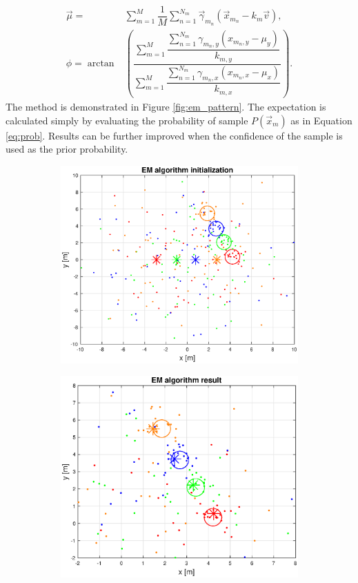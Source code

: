 \begin{align}
\vec{\mu} =& \sum_{m=1}^M \dfrac{1}{M}\sum_{n = 1}^{N_m}  \vec{\gamma}_{m_n} \left( \vec{x}_{m_n} - k_m \vec{v} \right) , \\
\phi = \arctan & \left( \dfrac{\sum_{m=1}^{M} \dfrac{\sum_{n = 1}^{N_m} \gamma_{m_n, y}(x_{m_n, y} - \mu_y)}{k_{m, y} } }{\sum_{m=1}^{M} \dfrac{\sum_{n = 1}^{N_m} \gamma_{m_n, x} (x_{m_n, x} - \mu_x) }{k_{m, x}} }\right).
\end{align}
The method is demonstrated in Figure \ref{fig:em_pattern}. The expectation is calculated simply by evaluating the probability of sample $P(\vec{x}_m)$ as in Equation \ref{eq:prob}. Results can be further improved when the confidence of the sample is used as the prior probability.

\begin{figure}[H]
	\centering
	\begin{subfigure}{0.49\textwidth}
		\centering
		\includegraphics[scale=0.43]{fig/em_init.eps}
	\end{subfigure}
	\begin{subfigure}{.49\textwidth}
		\centering
		\includegraphics[scale=0.43]{fig/em_result.eps}


\end{subfigure}
\end{figure}
